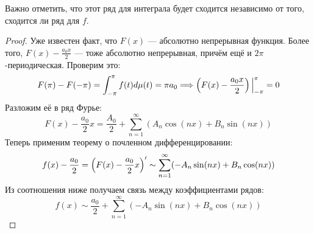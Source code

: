 \begin{note}
	Важно отметить, что этот ряд для интеграла будет сходится независимо от того, сходится ли ряд для $f$.
\end{note}

\begin{proof}
	Уже известен факт, что $F(x)$ --- абсолютно непрерывная функция. Более того, $F(x) - \frac{a_0x}{2}$ --- тоже абсолютно непрерывная, причём ещё и $2\pi$-периодическая. Проверим это:
	\[
		F(\pi) - F(-\pi) = \int_{-\pi}^\pi f(t)d\mu(t) = \pi a_0 \Longrightarrow \left(F(x) - \frac{a_0x}{2}\right)\Big|_{-\pi}^\pi = 0
	\]
	Разложим её в ряд Фурье:
	\[
		F(x) - \frac{a_0}{2}x = \frac{A_0}{2} + \sum_{n = 1}^\infty (A_n\cos(nx) + B_n\sin(nx))
	\]
	Теперь применим теорему о почленном дифференцировании:
	\[
		f(x) - \frac{a_0}{2} = \left(F(x) - \frac{a_0}{2}x\right)' \sim \sum_{n = 1}^\infty (-A_n\sin(nx) + B_n\cos(nx))
	\]
	Из соотношения ниже получаем связь между коэффициентами рядов:
	\[
		f(x) \sim \frac{a_0}{2} + \sum_{n = 1}^\infty (-A_n\sin(nx) + B_n\cos(nx))
	\]
\end{proof}